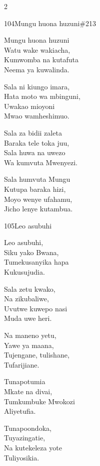 \begin{multicols}{2}
\begin{hymn}{104}{Mungu huona huzuni}{\#213}
\begin{stanza}
Mungu huona huzuni\\
Watu wake wakiacha,\\
Kumwomba na kutafuta\\
Neema ya kuwalinda.
\end{stanza}
\begin{stanza}
Sala ni kiungo imara,\\
Hata moto wa mbinguni,\\
Uwakao mioyoni\\
Mwao wamheshimuo.
\end{stanza}
\begin{stanza}
Sala za bidii zaleta\\
Baraka tele toka juu,\\
Sala huwa na uwezo\\
Wa kumvuta Mwenyezi.
\end{stanza}
\begin{stanza}
Sala humvuta Mungu\\
Kutupa baraka hizi,\\
Moyo wenye ufahamu,\\
Jicho lenye kutambua.
\end{stanza}
\end{hymn}

\begin{hymn}{105}{Leo asubuhi}{}
\begin{stanza}
Leo asubuhi,\\
Siku yako Bwana,\\
Tumekusanyika hapa\\
Kukusujudia.
\end{stanza}
\begin{stanza}
Sala zetu kwako,\\
Na zikubaliwe,\\
Uvutwe kuwepo nasi\\
Muda uwe heri.
\end{stanza}
\begin{stanza}
Na maneno yetu,\\
Yawe ya maana,\\
Tujengane, tulishane,\\
Tufarijiane.
\end{stanza}
\begin{stanza}
Tunapotumia\\
Mkate na divai,\\
Tumkumbuke Mwokozi\\
Aliyetufia.
\end{stanza}
\begin{stanza}
Tunapoondoka,\\
Tuyazingatie,\\
Na kutekeleza yote\\
Tuliyosikia.
\end{stanza}
\end{hymn}


\end{multicols}
